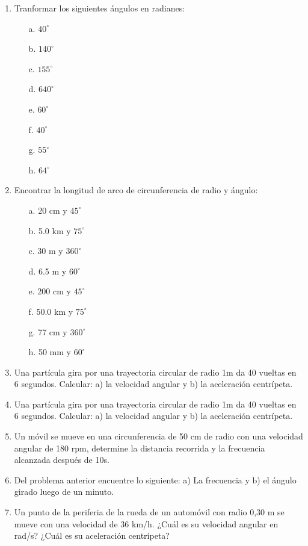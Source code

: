 \begin{enumerate}
\item Tranformar los siguientes ángulos en radianes:
\begin{itemize}
 \item[a.] $40^\circ$
 \item[b.] $140^\circ$
 \item[c.] $155^\circ$
 \item[d.] $640^\circ$
 \item[e.] $60^\circ$
 \item[f.] $40^\circ$
 \item[g.] $55^\circ$
 \item[h.] $64^\circ$
\end{itemize}

 \item Encontrar la longitud de arco de circunferencia de radio y ángulo:
\begin{itemize}
 \item[a.] 20 cm y $45^\circ$
 \item[b.] 5.0 km y $75^\circ$
 \item[c.] 30 m y $360^\circ$
 \item[d.] 6.5 m y $60^\circ$
  \item[e.] 200 cm y $45^\circ$
 \item[f.] 50.0 km y $75^\circ$
 \item[g.] 77 cm y $360^\circ$
 \item[h.] 50 mm y $60^\circ$
\end{itemize}

\item Una partícula gira por una trayectoria circular de radio 1m da 40 vueltas en 6 segundos. Calcular: a) la velocidad angular 
y b) la aceleración centrípeta.

\item  Una partícula gira por una trayectoria circular de radio 1m da 40 vueltas en 6 segundos. Calcular: a) la velocidad 
angular y b) la aceleración centrípeta.

\item  Un móvil se mueve en una circunferencia de 50 cm de radio con una velocidad angular de 180 rpm, determine la distancia 
recorrida y la frecuencia alcanzada después de 10s.


\item  Del problema anterior encuentre lo siguiente: a) La frecuencia y b) el ángulo girado luego de un minuto.


\item Un punto de la periferia de la rueda de un automóvil con radio 0,30 m se mueve con una velocidad de 36 km/h. ¿Cuál es su 
velocidad angular en rad/s? ¿Cuál es su aceleración centrípeta? 


\end{enumerate}
